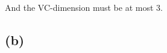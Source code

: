 \documentclass{article}
\begin{document}
  And the VC-dimension must be at most 3.

  \subsection{(b)}

\end{document}
